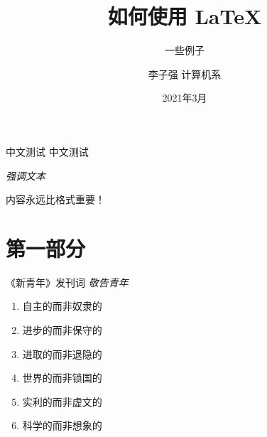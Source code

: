 \documentclass[compress, 10pt]{ctexbeamer}
\title[如何使用 \LaTeX]{\huge \textbf{ 如何使用 \LaTeX}}
\subtitle{一些例子}
\author{李子强 \enskip 计算机系}
\institute{\raggedleft 南方科技大学图书馆}
\date{2021年3月}
\begin{document}



{%
    \begin{frame}
    \maketitle
    \end{frame}%
}


\begin{frame}{中文测试}
    中文测试

    \emph{强调文本}

    \alert{内容永远比格式重要！}

\end{frame}


\section{第一部分}

\begin{frame}{《新青年》发刊词}
    \emph{敬告青年}
    \begin{enumerate}
        \item 自主的而非奴隶的
        \item 进步的而非保守的
        \item 进取的而非退隐的
        \item 世界的而非锁国的
        \item 实利的而非虚文的
        \item 科学的而非想象的
    \end{enumerate}

\end{frame}
\end{document}
